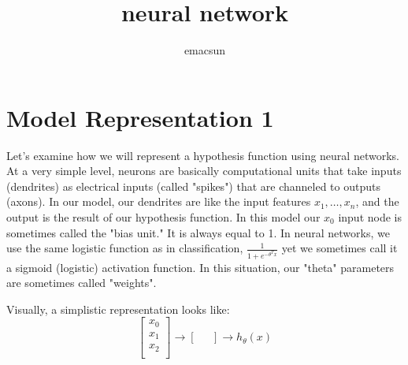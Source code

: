 \documentclass[10pt,a4paper,UTF8]{article}
\author{emacsun}
\date{}
\title{neural network}
\begin{document}
\maketitle
\tableofcontents
{}
\section{Model Representation 1}
\label{sec:orgdc1988f}


Let's examine how we will represent a hypothesis function using neural networks. At a very simple level, neurons are basically computational units that take inputs (dendrites) as electrical inputs (called "spikes") that are channeled to outputs (axons). In our model, our dendrites are like the input features \(x_{1},\ldots ,x_{n}\), and the output is the result of our hypothesis function. In this model our \(x_{0}\) input node is sometimes called the "bias unit." It is always equal to 1. In neural networks, we use the same logistic function as in classification, \(\frac{1}{1+e^{-\theta^{T}x}}\)  yet we sometimes call it a sigmoid (logistic) activation function. In this situation, our "theta" parameters are sometimes called "weights".

Visually, a simplistic representation looks like:
\begin{equation}
\label{eq:1}
\begin{bmatrix}x_0 \\ x_1 \\ x_2 \\ \end{bmatrix}\rightarrow\begin{bmatrix}\ \ \ \\ \end{bmatrix}\rightarrow h_\theta(x)
\end{equation}
\end{document}

